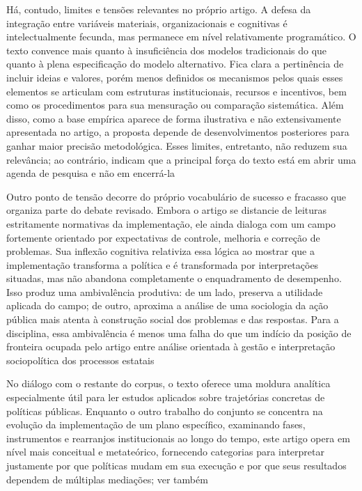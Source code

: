 \documentclass[12pt,a4paper]{article}
\begin{document}
Há, contudo, limites e tensões relevantes no próprio artigo. A defesa da integração entre variáveis materiais, organizacionais e cognitivas é intelectualmente fecunda, mas permanece em nível relativamente programático. O texto convence mais quanto à insuficiência dos modelos tradicionais do que quanto à plena especificação do modelo alternativo. Fica clara a pertinência de incluir ideias e valores, porém menos definidos os mecanismos pelos quais esses elementos se articulam com estruturas institucionais, recursos e incentivos, bem como os procedimentos para sua mensuração ou comparação sistemática. Além disso, como a base empírica aparece de forma ilustrativa e não extensivamente apresentada no artigo, a proposta depende de desenvolvimentos posteriores para ganhar maior precisão metodológica. Esses limites, entretanto, não reduzem sua relevância; ao contrário, indicam que a principal força do texto está em abrir uma agenda de pesquisa e não em encerrá-la\parencite{ascenzi2013_implementacao_politicas}

Outro ponto de tensão decorre do próprio vocabulário de sucesso e fracasso que organiza parte do debate revisado. Embora o artigo se distancie de leituras estritamente normativas da implementação, ele ainda dialoga com um campo fortemente orientado por expectativas de controle, melhoria e correção de problemas. Sua inflexão cognitiva relativiza essa lógica ao mostrar que a implementação transforma a política e é transformada por interpretações situadas, mas não abandona completamente o enquadramento de desempenho. Isso produz uma ambivalência produtiva: de um lado, preserva a utilidade aplicada do campo; de outro, aproxima a análise de uma sociologia da ação pública mais atenta à construção social dos problemas e das respostas. Para a disciplina, essa ambivalência é menos uma falha do que um indício da posição de fronteira ocupada pelo artigo entre análise orientada à gestão e interpretação sociopolítica dos processos estatais\parencite{ascenzi2013_implementacao_politicas}

No diálogo com o restante do corpus, o texto oferece uma moldura analítica especialmente útil para ler estudos aplicados sobre trajetórias concretas de políticas públicas. Enquanto o outro trabalho do conjunto se concentra na evolução da implementação de um plano específico, examinando fases, instrumentos e rearranjos institucionais ao longo do tempo, este artigo opera em nível mais conceitual e metateórico, fornecendo categorias para interpretar justamente por que políticas mudam em sua execução e por que seus resultados dependem de múltiplas mediações\parencite{ascenzi2013_implementacao_politicas}; ver também\parencite{mello2017_evolucao_plano}
\end{document}

